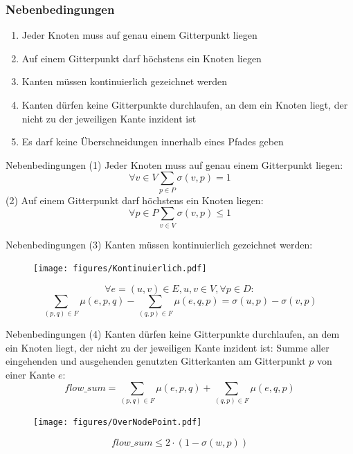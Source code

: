 \documentclass[9pt]{beamer}
\begin{document}
    \begin{frame}
    \frametitle{Nebenbedingungen}
    \begin{enumerate}[(1)]
    \item  Jeder Knoten muss auf genau einem Gitterpunkt liegen
    \item Auf einem Gitterpunkt darf höchstens ein Knoten liegen \pause 
    \item Kanten müssen kontinuierlich gezeichnet werden
    \item Kanten dürfen keine Gitterpunkte durchlaufen, an dem ein Knoten liegt, der nicht zu der jeweiligen Kante inzident ist
    \item Es darf keine Überschneidungen innerhalb eines Pfades geben
    \end{enumerate}
    \end{frame}

    \begin{frame}{Nebenbedingungen}
    (1) Jeder Knoten muss auf genau einem Gitterpunkt liegen:
        $$\forall v \in V \sum_{p \in P} \sigma(v,p) = 1$$
            (2) Auf einem Gitterpunkt darf höchstens ein Knoten liegen:
            $$\forall p \in P \sum_{v \in V} \sigma(v,p) \leq 1$$
    \end{frame}

    \begin{frame}{Nebenbedingungen}
    (3) Kanten müssen kontinuierlich gezeichnet werden:
    \begin{figure}[H]
    \begin{minipage}{0.35\textwidth}
    \centering
    \texttt{[image: figures/Kontinuierlich.pdf]}
    \label{fig:Kontinuierlich}
    \end{minipage}
    \begin{minipage}{0.57\textwidth}
    \pause 
    $$\forall e=(u,v) \in E, u,v \in V, \forall p \in D:$$ $$\sum_{(p,q) \in F} \mu(e,p,q) - \sum_{(q,p) \in F} \mu(e,q,p) = \sigma(u,p) - \sigma(v,p)$$
    \end{minipage}
\end{figure}
    \end{frame}

    \begin{frame}{Nebenbedingungen}
        (4) Kanten dürfen keine Gitterpunkte durchlaufen, an dem ein Knoten liegt, der nicht zu der jeweiligen Kante inzident ist:
        \newline 
        Summe aller eingehenden und ausgehenden genutzten Gitterkanten am Gitterpunkt $p$ von einer Kante $e$: $$flow\_sum = \sum_{(p,q) \in F} \mu(e,p,q) + \sum_{(q,p) \in F} \mu(e,q,p)$$\pause 
        \begin{figure}[H]
            \centering
            \texttt{[image: figures/OverNodePoint.pdf]}
            \label{fig:OverNodePoint}
        \end{figure}
        $$flow\_sum \leq 2 \cdot (1 - \sigma(w,p))$$
    \end{frame}
\end{document}
